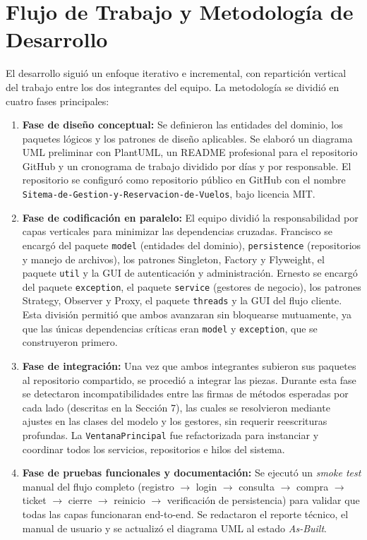 \documentclass[12pt, letterpaper]{article}
\begin{document}
	\section{Flujo de Trabajo y Metodología de Desarrollo}
	El desarrollo siguió un enfoque iterativo e incremental, con repartición vertical del trabajo entre los dos integrantes del equipo. La metodología se dividió en cuatro fases principales:
	
	\begin{enumerate}
		\item \textbf{Fase de diseño conceptual:} Se definieron las entidades del dominio, los paquetes lógicos y los patrones de diseño aplicables. Se elaboró un diagrama UML preliminar con PlantUML, un README profesional para el repositorio GitHub y un cronograma de trabajo dividido por días y por responsable. El repositorio se configuró como repositorio público en GitHub con el nombre \texttt{Sitema-de-Gestion-y-Reservacion-de-Vuelos}, bajo licencia MIT.
		
		\item \textbf{Fase de codificación en paralelo:} El equipo dividió la responsabilidad por capas verticales para minimizar las dependencias cruzadas. Francisco se encargó del paquete \texttt{model} (entidades del dominio), \texttt{persistence} (repositorios y manejo de archivos), los patrones Singleton, Factory y Flyweight, el paquete \texttt{util} y la GUI de autenticación y administración. Ernesto se encargó del paquete \texttt{exception}, el paquete \texttt{service} (gestores de negocio), los patrones Strategy, Observer y Proxy, el paquete \texttt{threads} y la GUI del flujo cliente. Esta división permitió que ambos avanzaran sin bloquearse mutuamente, ya que las únicas dependencias críticas eran \texttt{model} y \texttt{exception}, que se construyeron primero.
		
		\item \textbf{Fase de integración:} Una vez que ambos integrantes subieron sus paquetes al repositorio compartido, se procedió a integrar las piezas. Durante esta fase se detectaron incompatibilidades entre las firmas de métodos esperadas por cada lado (descritas en la Sección 7), las cuales se resolvieron mediante ajustes en las clases del modelo y los gestores, sin requerir reescrituras profundas. La \texttt{VentanaPrincipal} fue refactorizada para instanciar y coordinar todos los servicios, repositorios e hilos del sistema.
		
		\item \textbf{Fase de pruebas funcionales y documentación:} Se ejecutó un \textit{smoke test} manual del flujo completo (registro $\rightarrow$ login $\rightarrow$ consulta $\rightarrow$ compra $\rightarrow$ ticket $\rightarrow$ cierre $\rightarrow$ reinicio $\rightarrow$ verificación de persistencia) para validar que todas las capas funcionaran end-to-end. Se redactaron el reporte técnico, el manual de usuario y se actualizó el diagrama UML al estado \textit{As-Built}.
	\end{enumerate}
	
\end{document}

